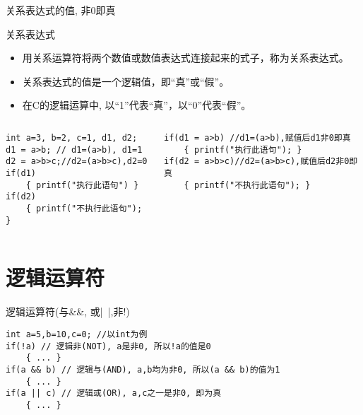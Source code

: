 \begin{frame}{关系表达式的值, 非0即真}
\begin{block}{关系表达式}
	\small
	\begin{itemize}
		\item 用关系运算符将两个数值或数值表达式连接起来的式子，称为关系表达式。
		\item 关系表达式的值是一个逻辑值，即``真''或``假''。
		\item 在C的逻辑运算中, 以``1''代表``真''，以``0''代表``假''。	
	\end{itemize}
\end{block}
\vspace{-0.5cm}
\begin{columns}[T]
\begin{lstlisting}
int a=3, b=2, c=1, d1, d2; 
d1 = a>b; // d1=(a>b), d1=1
d2 = a>b>c;//d2=(a>b>c),d2=0
if(d1)
	{ printf("执行此语句") }
if(d2) 
	{ printf("不执行此语句"); }
\end{lstlisting}
\begin{lstlisting}
if(d1 = a>b) //d1=(a>b),赋值后d1非0即真
	{ printf("执行此语句"); }
if(d2 = a>b>c)//d2=(a>b>c),赋值后d2非0即真
	{ printf("不执行此语句"); }
\end{lstlisting}
\end{columns}
\end{frame}

\section{逻辑运算符}

\begin{frame}{逻辑运算符(与\&\&, 或|~|,非!)}
\begin{lstlisting}
int a=5,b=10,c=0; //以int为例
if(!a) // 逻辑非(NOT), a是非0, 所以!a的值是0
	{ ... }
if(a && b) // 逻辑与(AND), a,b均为非0, 所以(a && b)的值为1
	{ ... }
if(a || c) // 逻辑或(OR), a,c之一是非0, 即为真
	{ ... }
\end{lstlisting}
\end{frame}

